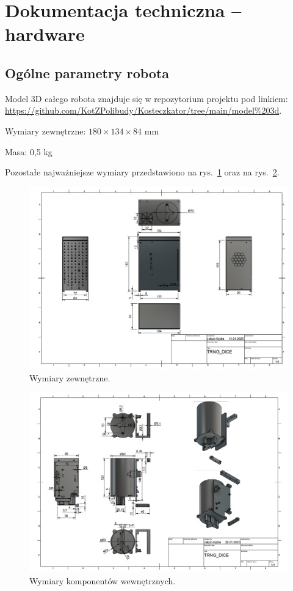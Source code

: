 \section{Dokumentacja techniczna -- hardware}\label{sec:dokumentacja-techniczna}

\subsection{Ogólne parametry robota}
Model 3D całego robota znajduje się w repozytorium projektu pod linkiem: \url{https://github.com/KotZPolibudy/Kosteczkator/tree/main/model%203d}.

Wymiary zewnętrzne: $180 \times 134 \times 84$ mm

Masa: 0,5 kg

Pozostałe najważniejsze wymiary przedstawiono na rys.~\ref{fig:wymiary} oraz na rys.~\ref{fig:wymiary_wew}.
\begin{figure}[H]
    \centering
    \includegraphics[width=0.95\linewidth]{chapters/03-praca-wlasna/figures/wym_zwe.png}
    \caption{\label{fig:wymiary}Wymiary zewnętrzne.}
\end{figure}
\begin{figure}[H]
    \centering
    \includegraphics[width=0.95\linewidth]{chapters/03-praca-wlasna/figures/wym_wew.png}
    \caption{\label{fig:wymiary_wew}Wymiary komponentów wewnętrznych.}
\end{figure}

